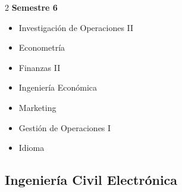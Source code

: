 \documentclass[12pt,a4paper]{article}
\begin{document}
\begin{multicols}{2}
		\textbf{Semestre 6}
		\begin{itemize}
			\item Investigación de Operaciones II
			\item Econometría
			\item Finanzas II
			\item Ingeniería Económica
			\item Marketing
			\item Gestión de Operaciones I
			\item Idioma
		\end{itemize}
	\end{multicols}
	
	\newpage
	
	\subsection{Ingeniería Civil Electrónica}
	
\end{document}
